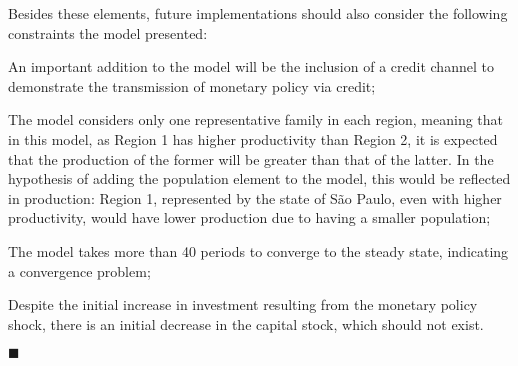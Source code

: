\documentclass[../thesis.tex]{subfiles}
\begin{document}
Besides these elements, future implementations should also consider the following constraints the model presented:
\begin{enumerate*}[label=(\arabic*)]

	\item An important addition to the model will be the inclusion of a credit channel to demonstrate the transmission of monetary policy via credit;
	
	\item The model considers only one representative family in each region, meaning that in this model, as Region 1 has higher productivity than Region 2, it is expected that the production of the former will be greater than that of the latter. In the hypothesis of adding the population element to the model, this would be reflected in production: Region 1, represented by the state of São Paulo, even with higher productivity, would have lower production due to having a smaller population;
	
	\item The model takes more than 40 periods to converge to the steady state, indicating a convergence problem;
	
	\item Despite the initial increase in investment resulting from the monetary policy shock, there is an initial decrease in the capital stock, which should not exist.
	
	
\end{enumerate*} \hfill $\blacksquare$
\end{document}
